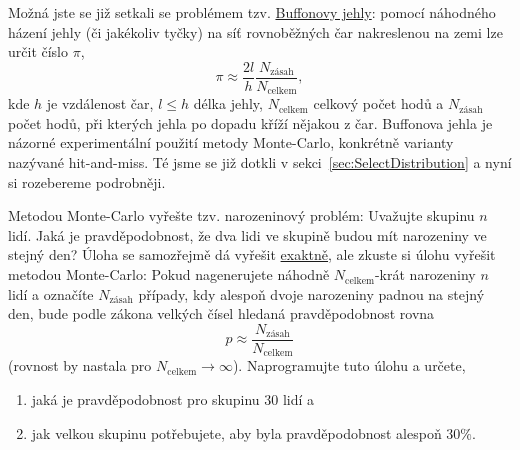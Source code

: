 \documentclass[a4paper,11pt,twoside]{article}
\theoremstyle{red}
\theoremstyle{green}
\begin{document}
    Možná jste se již setkali se problémem tzv. \href{https://cs.wikipedia.org/wiki/Buffonova_jehla}{Buffonovy jehly}: pomocí náhodného házení jehly (či jakékoliv tyčky) na síť rovnoběžných čar nakreslenou na zemi lze určit číslo $\pi$, 
    \begin{equation}
        \pi\approx\frac{2l}{h}\frac{N_{\text{zásah}}}{N_\text{celkem}},
    \end{equation}
    kde $h$ je vzdálenost čar, $l\leq h$ délka jehly, $N_{\text{celkem}}$ celkový počet hodů a $N_{\text{zásah}}$ počet hodů, při kterých jehla po dopadu kříží nějakou z čar.
    Buffonova jehla je názorné experimentální použití metody Monte-Carlo, konkrétně varianty nazývané hit-and-miss.
    Té jsme se již dotkli v sekci~\ref{sec:SelectDistribution} a nyní si rozebereme podrobněji.
    
    \begin{solved}
        Metodou Monte-Carlo vyřešte tzv. narozeninový problém: Uvažujte skupinu $n$ lidí. 
        Jaká je pravděpodobnost, že dva lidi ve skupině budou mít narozeniny ve stejný den?
        Úloha se samozřejmě dá vyřešit \href{https://cs.wikipedia.org/wiki/Narozeninov%C3%BD_probl%C3%A9m}{exaktně}, ale zkuste si úlohu vyřešit metodou Monte-Carlo:
        Pokud nagenerujete náhodně $N_{\text{celkem}}$-krát narozeniny $n$ lidí a označíte $N_{\text{zásah}}$ případy, kdy alespoň dvoje narozeniny padnou na stejný den, bude podle zákona velkých čísel hledaná pravděpodobnost rovna
        \begin{equation}
            p\approx\frac{N_{\text{zásah}}}{N_{\text{celkem}}}
        \end{equation}
        (rovnost by nastala pro $N_{\text{celkem}}\rightarrow\infty$).
        Naprogramujte tuto úlohu a určete,
        \begin{enumerate}
            \item jaká je pravděpodobnost pro skupinu $30$ lidí a
            \item jak velkou skupinu potřebujete, aby byla pravděpodobnost alespoň $30\%$.
        \end{enumerate}
    \end{solved}
\end{document}

